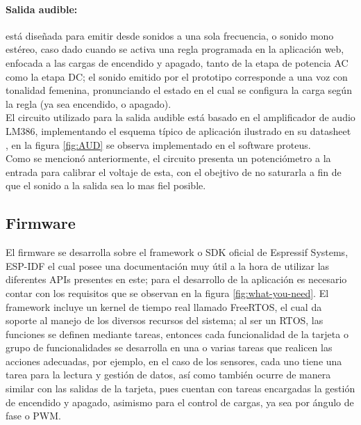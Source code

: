 	\paragraph{Salida audible:}
		está diseñada para emitir desde sonidos a una sola frecuencia, o sonido mono estéreo, caso dado cuando se activa una regla programada en la aplicación web, enfocada a las cargas de encendido y apagado, tanto de la etapa de potencia AC como la etapa DC; el sonido emitido por el prototipo corresponde a una voz con tonalidad femenina, pronunciando el estado en el cual se configura la carga según la regla (ya sea encendido, o apagado).\\
		
		El circuito utilizado para la salida audible está basado en el amplificador de audio LM386, implementando el esquema típico de aplicación ilustrado en su datasheet \cite{LM386}, en la figura \ref{fig:AUD} se observa implementado en el software proteus.\\
		
		Como se mencionó anteriormente, el circuito presenta un potenciómetro a la entrada para calibrar el voltaje de esta, con el obejtivo de no saturarla a fin de que el sonido a la salida sea lo mas fiel posible.\\
		
				
\subsection{Firmware}

El firmware se desarrolla sobre el framework o SDK oficial de Espressif Systems, ESP-IDF el cual posee una documentación \cite{ES} muy útil a la hora de utilizar las diferentes APIs presentes en este; para el desarrollo de la aplicación es necesario contar con los requisitos que se observan en la figura \ref{fig:what-you-need}. El framework incluye un kernel de tiempo real llamado FreeRTOS, el cual da soporte al manejo de los diversos recursos del sistema; al ser un RTOS, las funciones se definen mediante tareas, entonces cada funcionalidad de la tarjeta o grupo de funcionalidades se desarrolla en una o varias tareas que realicen las acciones adecuadas, por ejemplo, en el caso de los sensores, cada uno tiene una tarea para la lectura y gestión de datos, así como también ocurre de manera similar con las salidas de la tarjeta, pues cuentan con tareas encargadas la gestión de encendido y apagado, asimismo para el control de cargas, ya sea por ángulo de fase o PWM.\\

